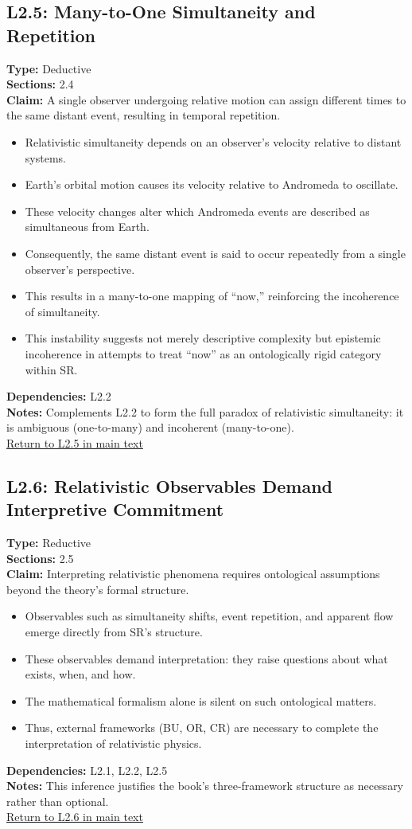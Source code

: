 \documentclass[12pt]{book}
\newcommand{\returnlink}[1]{\hyperref[logic:#1]{Return to #1 in main text}\xspace}
\begin{document}
\subsection*{L2.5: Many-to-One Simultaneity and Repetition}\label{appendix:L2.5}
\textbf{Type:} Deductive \\
\textbf{Sections:} 2.4 \\
\textbf{Claim:} A single observer undergoing relative motion can assign different times to the same distant event, resulting in temporal repetition.
\begin{itemize}
  \item Relativistic simultaneity depends on an observer's velocity relative to distant systems.
  \item Earth's orbital motion causes its velocity relative to Andromeda to oscillate.
  \item These velocity changes alter which Andromeda events are described as simultaneous from Earth.
  \item Consequently, the same distant event is said to occur repeatedly from a single observer's perspective.
  \item This results in a many-to-one mapping of ``now,'' reinforcing the incoherence of simultaneity.
  \item This instability suggests not merely descriptive complexity but epistemic incoherence in attempts to treat ``now'' as an ontologically rigid category within SR.
\end{itemize}
\textbf{Dependencies:} L2.2 \\
\textbf{Notes:} Complements L2.2 to form the full paradox of relativistic simultaneity: it is ambiguous (one-to-many) and incoherent (many-to-one).\\
\returnlink{L2.5}

\subsection*{L2.6: Relativistic Observables Demand Interpretive Commitment}\label{appendix:L2.6}
\textbf{Type:} Reductive \\
\textbf{Sections:} 2.5 \\
\textbf{Claim:} Interpreting relativistic phenomena requires ontological assumptions beyond the theory's formal structure.
\begin{itemize}
  \item Observables such as simultaneity shifts, event repetition, and apparent flow emerge directly from SR's structure.
  \item These observables demand interpretation: they raise questions about what exists, when, and how.
  \item The mathematical formalism alone is silent on such ontological matters.
  \item Thus, external frameworks (BU, OR, CR) are necessary to complete the interpretation of relativistic physics.
\end{itemize}
\textbf{Dependencies:} L2.1, L2.2, L2.5 \\
\textbf{Notes:} This inference justifies the book's three-framework structure as necessary rather than optional.\\
\returnlink{L2.6}
\end{document}

